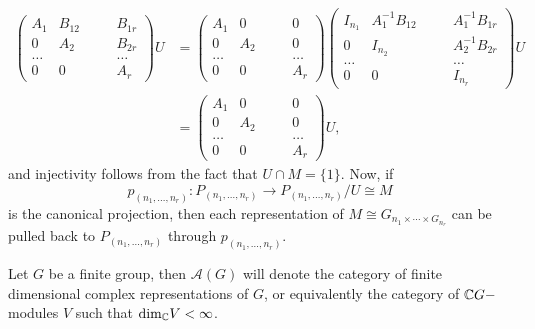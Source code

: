 \begin{equation}
\begin{split}
    \left(\begin{smallmatrix}
          A_1 & B_{12}&\quad &B_{1r}\\
         0 & A_2& &B_{2r}\\
          \dots& & &\dots\\
           0 & 0& &A_r
    \end{smallmatrix}\right)U&= \left(\begin{smallmatrix}
        A_1 & 0&\quad &0\\
         0 & A_2& &0\\
          \dots& & &\dots\\
           0 & 0& &A_r
    \end{smallmatrix}\right) 
    \left(\begin{smallmatrix}
        I_{n_1} & A_1^{-1}B_{12}&\quad &A_1^{-1}B_{1r}\\
         0 & I_{n_2}& &A_2^{-1}B_{2r}\\
          \dots& & &\dots\\
           0 & 0& &I_{n_r}
    \end{smallmatrix}\right)U\\
    &=\left(\begin{smallmatrix}
        A_1 & 0&\quad &0\\
         0 & A_2& &0\\
          \dots& & &\dots\\
           0 & 0& &A_r
    \end{smallmatrix}\right)U,
    \end{split}
\end{equation}
and injectivity follows from the fact that $U\cap M=\{1\}$. Now, if 
\begin{equation}
    p_{(n_1,\dots,n_r)}:P_{(n_1,\dots,n_r)}\rightarrow P_{(n_1,\dots,n_r)}/U\cong M
\end{equation}
is the canonical projection, then each representation of $M\cong G_{n_1\times\cdots\times G_{n_r}}$ can be pulled back to $P_{(n_1,\dots,n_r)}$ through $p_{(n_1,\dots,n_r)}$.
\begin{dang}
    \begin{notation}
      Let $G$ be a finite group, then $\mathcal{A}(G)$ will denote the category of finite dimensional complex representations of $G$, or equivalently the category of $\mathbb{C}G-$modules $V$ such that $\text{dim}_{\mathbb{C}}V<\infty$.
    \end{notation}
\end{dang}
